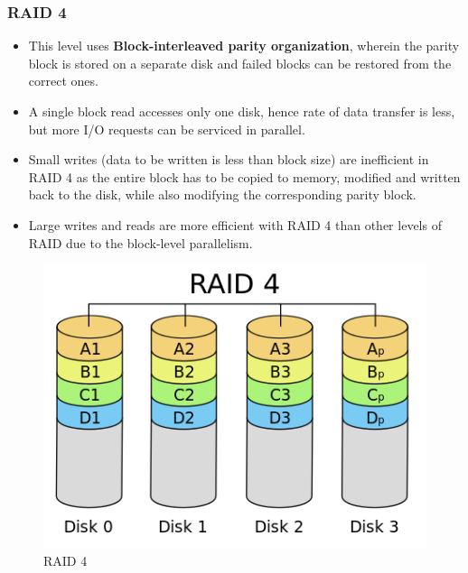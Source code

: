 \documentclass{article}
\theoremstyle{plain}
\theoremstyle{definition}
\begin{document}
\subsubsection{RAID 4}
\begin{itemize}
    \item This level uses \textbf{Block-interleaved parity organization}, wherein the parity block is stored on a separate disk and failed blocks can be restored from the correct ones. 
    
    \item A single block read accesses only one disk, hence rate of data transfer is less, but more I/O requests can be serviced in parallel.
    
    \item Small writes (data to be written is less than block size) are inefficient in RAID 4 as the entire block has to be copied to memory, modified and written back to the disk, while also modifying the corresponding parity block. 
    
    \item Large writes and reads are more efficient with RAID 4 than other levels of RAID due to the block-level parallelism.
\end{itemize}

\begin{figure}[!h]
    \centering
    \includegraphics[scale=0.4]{raid4.png}
    \caption{RAID 4}
    \label{fig:my_label_4}
\end{figure}
\end{document}
